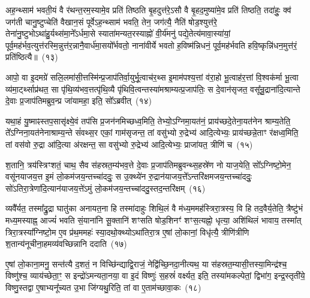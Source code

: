 अह॒न्थ्साम॑ भवती॒यं वै र॑थन्त॒रम॒स्यामे॒व प्रति॑ तिष्ठति बृ॒हदुत्त॑रे॒\-ऽसौ वै बृ॒हद॒मुष्या॑मे॒व प्रति॑ तिष्ठति॒ तदा॑हुः॒ क्व॑ जग॑ती चानु॒ष्टुप्चेति॑ वैखान॒सं पूर्वे\-ऽह॒न्थ्साम॑ भवति॒ तेन॒ जग॑त्यै॒ नैति॑ षोड॒श्युत्त॑रे॒ तेना॑नु॒ष्टुभो\-ऽथा॑हु॒र्यथ्स॑मा॒ने᳚\-ऽर्धमा॒से स्याता॑मन्यत॒रस्याह्नो॑ वी॒र्य॑मनु॑ पद्ये॒तेत्य॑मावा॒स्या॑यां॒ पूर्व॒मह॑र्भव॒त्युत्त॑रस्मि॒न्नुत्त॑र॒न्नानै॒वार्ध॑मा॒सयो᳚र्भवतो॒ नाना॑वीर्ये भवतो ह॒विष्म॑न्निधनं॒ पूर्व॒मह॑र्भवति हवि॒ष्कृन्नि॑धन॒मुत्त॑रं॒ प्रति॑ष्ठित्यै॥~(१३)\ip

{}

आपो॒ वा इ॒दमग्रे॑ सलि॒लमा॑सी॒त्तस्मि॑न्प्र॒जा\-प॑तिर्वा॒युर्भू॒त्वाच॑र॒थ्स इ॒माम॑पश्य॒त्तां व॑रा॒हो भू॒त्वाह॑र॒त्तां वि॒श्वक॑र्मा भू॒त्वा व्य॑मा॒र्ट्थ्साप्र॑थत॒ सा पृ॑थि॒व्य॑भव॒त्तत्पृ॑थि॒व्यै पृ॑थिवि॒त्वन्तस्या॑मश्राम्यत्प्र॒जा\-प॑तिः॒ स दे॒वान॑सृजत॒ वसू᳚न्रु॒द्राना॑दि॒त्यान्ते दे॒वाः प्र॒जा\-प॑तिमब्रुव॒न्प्र जा॑यामहा॒ इति॒ सो᳚\-ऽब्रवीत्~(१४)\ip

यथा॒हं यु॒ष्माꣴस्तप॒सासृ॑क्ष्ये॒वं तप॑सि प्र॒जन॑नमिच्छध्व॒मिति॒ तेभ्यो॒\-ऽग्निमा॒यत॑नं॒ प्राय॑च्छदे॒तेना॒यत॑नेन श्राम्य॒तेति॒ ते᳚\-ऽग्निना॒यत॑नेनाश्राम्य॒न्ते सं॑वथ्स॒र एकां॒ गाम॑सृजन्त॒ तां वसु॑भ्यो रु॒द्रेभ्य॑ आदि॒त्येभ्यः॒ प्राय॑च्छन्ने॒ताꣳ र॑क्षध्व॒मिति॒ तां वस॑वो रु॒द्रा आ॑दि॒त्या अ॑रक्षन्त॒ सा वसु॑भ्यो रु॒द्रेभ्य॑ आदि॒त्येभ्यः॒ प्राजा॑यत॒ त्रीणि॑ च~(१५)\ip

श॒तानि॒ त्रय॑स्त्रिꣳशतं॒ चाथ॒ सैव स॑हस्रत॒म्य॑भव॒त्ते दे॒वाः प्र॒जा\-प॑तिमब्रुवन्थ्स॒हस्रे॑ण नो याज॒येति॒ सो᳚\-ऽग्निष्टो॒मेन॒ वसू॑नयाजय॒त्त इ॒मं लो॒कम॑जय॒न्तच्चा॑ददुः॒ स उ॒क्थ्ये॑न रु॒द्रान॑याजय॒त्ते᳚\-ऽन्तरि॑क्षमजय॒न्तच्चा॑ददुः॒ सो॑\-ऽतिरा॒त्रेणा॑\-दि॒त्यान॑याजय॒त्ते॑\-ऽमुं लो॒कम॑जय॒न्तच्चा॑ददु॒स्तद॒न्तरि॑क्षम्~(१६)\ip

व्यवै᳚र्यत॒ तस्मा᳚द्\-रु॒द्रा घातु॑का अनायत॒ना हि तस्मा॑दाहुः शिथि॒लं वै म॑ध्य॒ममह॑स्त्रिरा॒त्रस्य॒ वि हि तद॒वैर्य॒तेति॒ त्रैष्टु॑भं मध्य॒मस्याह्न॒ आज्यं॑ भवति सं॒याना॑नि सू॒क्तानि॑ शꣳसति षोड॒शिनꣳ॑ शꣳस॒त्यह्नो॒ धृत्या॒ अशि॑थिलं भावाय॒ तस्मा᳚त् त्रिरा॒त्रस्या᳚ग्निष्टो॒म ए॒व प्र॑थ॒ममहः॑ स्या॒दथो॒क्थ्यो\-ऽथा॑तिरा॒त्र ए॒षां लो॒कानां॒ विधृ॑त्यै॒ त्रीणि॑त्रीणि श॒तान्य॑नूचीना॒हमव्य॑वच्छिन्नानि ददाति~(१७)\ip

ए॒षां लो॒काना॒मनु॒ सन्त॑त्यै द॒शतं॒ न विच्छि॑न्द्याद्वि॒राजं॒ नेद्वि॑च्छि॒नदा॒नीत्यथ॒ या स॑हस्रत॒म्यासी॒त्तस्या॒मिन्द्र॑श्च॒ विष्णु॑श्च॒ व्याय॑च्छेता॒ꣳ॒ स इन्द्रो॑\-ऽमन्यता॒नया॒ वा इ॒दं विष्णुः॑ स॒हस्रं॑ वर्क्ष्यत॒ इति॒ तस्या॑मकल्पेतां॒ द्विभा॑ग॒ इन्द्र॒स्तृती॑ये॒ विष्णु॒स्तद्वा ए॒षाभ्यनू᳚च्यत उ॒भा जि॑ग्यथु॒रिति॒ तां वा ए॒ताम॑च्छावा॒कः~(१८)\ip

